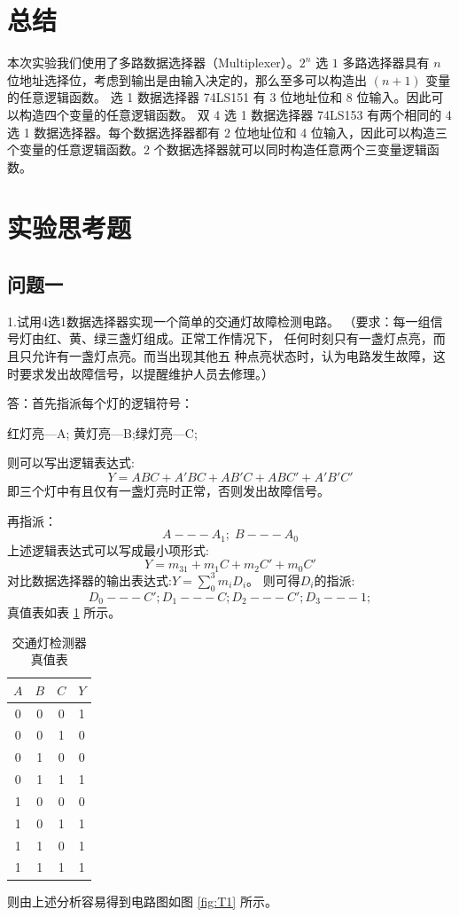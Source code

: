 \documentclass[a4paper,11pt,UTF8]{ctexart}
\begin{document}
\section{总结}
 \p 本次实验我们使用了多路数据选择器（Multiplexer）。$2^n$ 选 $1$ 多路选择器具有 $n$ 位地址选择位，考虑到输出是由输入决定的，那么至多可以构造出 $(n+1)$ 变量的任意逻辑函数。
  选 1 数据选择器 74LS151 有 3 位地址位和 8 位输入。因此可以构造四个变量的任意逻辑函数。
 \p 双 4 选 1 数据选择器 74LS153 有两个相同的 4 选 1 数据选择器。每个数据选择器都有 2 位地址位和 4 位输入，因此可以构造三个变量的任意逻辑函数。2 个数据选择器就可以同时构造任意两个三变量逻辑函数。
 
\section{实验思考题}
\subsection{问题一}
1.试用4选1数据选择器实现一个简单的交通灯故障检测电路。
（要求：每一组信号灯由红、黄、绿三盏灯组成。正常工作情况下，
任何时刻只有一盏灯点亮，而且只允许有一盏灯点亮。而当出现其他五
种点亮状态时，认为电路发生故障，这时要求发出故障信号，以提醒维护人员去修理。）

答：首先指派每个灯的逻辑符号：

红灯亮---A; 黄灯亮---B;绿灯亮---C;

则可以写出逻辑表达式:
\begin{equation}
  Y=ABC+A'BC+AB'C+ABC'+A'B'C'
\end{equation}
即三个灯中有且仅有一盏灯亮时正常，否则发出故障信号。

再指派：
\begin{equation}
  A---A_1;\;B---A_0
\end{equation}
上述逻辑表达式可以写成最小项形式:
\begin{equation}
  Y=m_31+m_1C+m_2C'+m_0C'
\end{equation}
对比数据选择器的输出表达式:$Y=\sum_0^3m_iD_i$。
则可得$D_i$的指派:
\begin{equation}
  D_0---C';D_1---C;D_2---C';D_3---1;
\end{equation}
真值表如表 \ref{tab:T1} 所示。
\begin{table}[H]
  \centering
  \begin{tabular}{|ccc|c|}\hline
   $A$&$B$&$C$ &$Y$
   \\\hline
   0&0&0 &1
   \\\hline
   0&0&1 &0
   \\\hline
   0&1&0 &0
   \\\hline
   0&1&1 &1
   \\\hline
   1&0&0 &0
   \\\hline
   1&0&1 &1
   \\\hline
   1&1&0 &1
   \\\hline
   1&1&1 &1
   \\\hline
  \end{tabular}
  \caption{交通灯检测器真值表}
  \label{tab:T1}
 \end{table}
则由上述分析容易得到电路图如图 \ref{fig:T1} 所示。
\end{document}
